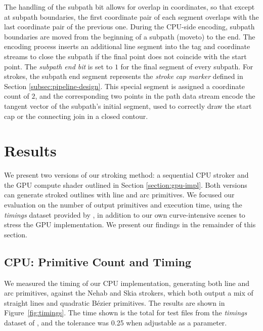 \documentclass[sigconf, nonacm]{acmart}
\begin{document}
The handling of the subpath bit allows for overlap in coordinates, so that except at subpath boundaries, the first coordinate pair of each segment overlaps with the last coordinate pair of the previous one. During the CPU-side encoding, subpath boundaries are moved from the beginning of a subpath (moveto) to the end. The encoding process inserts an additional line segment into the tag and coordinate streams to close the subpath if the final point does not coincide with the start point. The \emph{subpath end bit} is set to $1$ for the final segment of every subpath. For strokes, the subpath end segment represents the \emph{stroke cap marker} defined in Section \ref{subsec:pipeline-design}. This special segment is assigned a coordinate count of $2$, and the corresponding two points in the path data stream encode the tangent vector of the subpath's initial segment, used to correctly draw the start cap or the connecting join in a closed contour.


\section{Results}


We present two versions of our stroking method: a sequential CPU stroker and the GPU compute shader outlined in Section \ref{section:gpu-impl}. Both versions can generate stroked outlines with line and arc primitives. We focused our evaluation on the number of output primitives and execution time, using the \emph{timings} dataset provided by \citet{Nehab2020}, in addition to our own curve-intensive scenes to stress the GPU implementation. We present our findings in the remainder of this section.

\subsection{CPU: Primitive Count and Timing}

We measured the timing of our CPU implementation, generating both line and arc primitives, against the Nehab and Skia strokers, which both output a mix of straight lines and quadratic Bézier primitives. The results are shown in Figure~\ref{fig:timings}. The time shown is the total for test files from the \emph{timings} dataset of \citet{Nehab2020}, and the tolerance was 0.25 when adjustable as a parameter.
\end{document}

